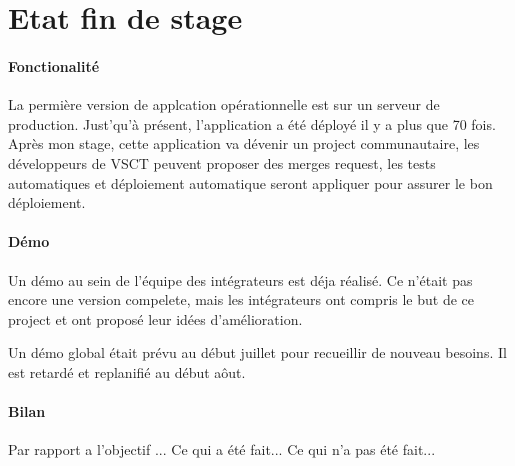 \section{Etat fin de stage}

\paragraph{Fonctionalité}
La permière version de applcation opérationnelle est sur un serveur de production.
Just'qu'à présent, l'application a été déployé il y a plus que 70 fois.
Après mon stage, cette application va dévenir un project communautaire,
les développeurs de VSCT peuvent proposer des merges request,
les tests automatiques et déploiement automatique seront appliquer pour assurer le bon déploiement.

\paragraph{Démo}
Un démo au sein de l'équipe des intégrateurs est déja réalisé.
Ce n'était pas encore une version compelete, mais les intégrateurs ont compris le but de ce project et ont proposé leur idées d'amélioration.

Un démo global était prévu au début juillet pour recueillir de nouveau besoins. Il est retardé et replanifié au début aôut.

\paragraph{Bilan}
Par rapport a l'objectif ...
Ce qui a été fait...
Ce qui n'a pas été fait...

\clearpage
